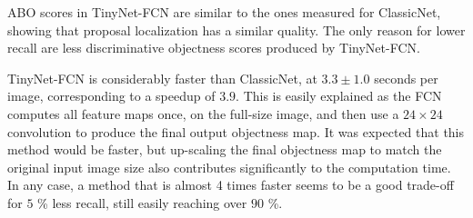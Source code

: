 ABO scores in TinyNet-FCN are similar to the ones measured for ClassicNet, showing that proposal localization has a similar quality. The only reason for lower recall are less discriminative objectness scores produced by TinyNet-FCN.

TinyNet-FCN is considerably faster than ClassicNet, at $3.3 \pm 1.0$ seconds per image, corresponding to a speedup of $3.9$. This is easily explained as the FCN computes all feature maps once, on the full-size image, and then use a $24 \times 24$ convolution to produce the final output objectness map. It was expected that this method would be faster, but up-scaling the final objectness map to match the original input image size also contributes significantly to the computation time. In any case, a method that is almost 4 times faster seems to be a good trade-off for $5$ \% less recall, still easily reaching over $90$ \%.

